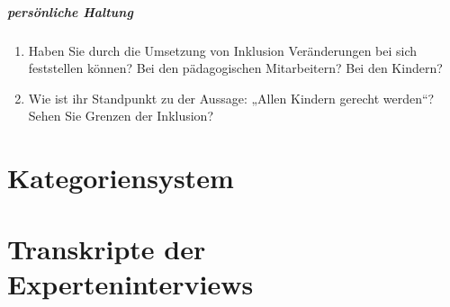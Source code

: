 \paragraph{persönliche Haltung}
\begin{enumerate}
\item Haben Sie durch die Umsetzung von Inklusion Veränderungen bei sich feststellen können? Bei den pädagogischen Mitarbeitern? Bei den Kindern? 
\item Wie ist ihr Standpunkt zu der Aussage: „Allen Kindern gerecht werden“? Sehen Sie Grenzen der Inklusion?
\end{enumerate}


\chapter{Kategoriensystem}

\chapter{Transkripte der Experteninterviews}
